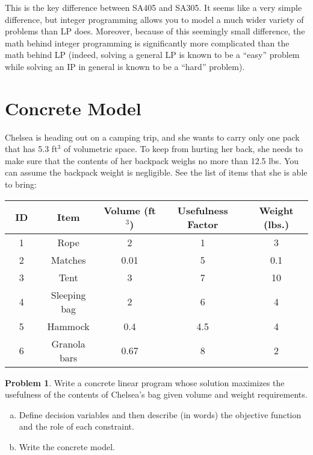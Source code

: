 \documentclass[12pt]{article}
\theoremstyle{definition}
\newtheorem{problem}{Problem}
\begin{document}
\vspace{1.5in}
This is the key difference between SA405 and SA305. It seems like a very simple difference, but integer programming allows you to model a much wider variety of problems than LP does. Moreover, because of this seemingly small difference, the math behind integer programming is significantly more complicated than the math behind LP (indeed, solving a general LP is known to be a ``easy'' problem while solving an IP in general is known to be a ``hard'' problem).

\newpage


\section{Concrete Model}

Chelsea is heading out on a camping trip, and she wants to carry only one pack that has 5.3 ft$^3$ of volumetric space. To keep from hurting her back, she needs to make sure that the contents of her backpack weighs no more than 12.5 lbs. You can assume the backpack weight is negligible. See the list of items that she is able to bring:


\begin{center}
\begin{tabular}{|c|c |c| c| c|}
\hline
~ID~ & Item & Volume (ft$^3$) & Usefulness Factor & Weight (lbs.)\\ \hline
1 & Rope & 2 & 1 & 3 \\ \hline
2 & Matches & 0.01 & 5 & 0.1 \\  \hline
3 & Tent & 3 & 7 & 10   \\ \hline
4 & Sleeping bag & 2 & 6 & 4   \\ \hline
5 & Hammock & 0.4 & 4.5 & 4   \\ \hline
6 & Granola bars & 0.67 & 8 & 2   \\ \hline
\end{tabular}
\end{center}

\begin{problem}  Write a concrete linear program whose solution maximizes the usefulness of the contents of Chelsea's bag given volume and weight requirements.

\begin{enumerate}[a)]
\item Define decision variables and then describe (in words) the objective function and the role of each constraint. 

\pagebreak

\item Write the concrete model.






\end{enumerate}
\end{problem}
\end{document}
